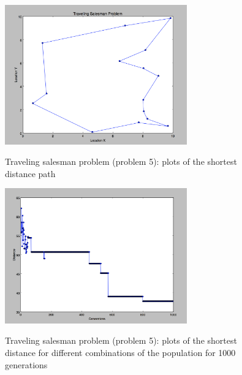 \documentclass{article}
\begin{document}
\begin{figure}[h]
\includegraphics[width=0.7\textwidth]{Traveling_salesman_path}
\centering
\caption{Traveling salesman problem (problem 5): plots of the shortest distance path}
\label{fig:tsp1}

\includegraphics[width=0.7\textwidth]{Distance_vs_generation}
\label{fig:tsp2}
\centering
\caption{Traveling salesman problem (problem 5): plots of the shortest distance for different combinations of the population for 1000 generations}

\end{figure}
\end{document}
